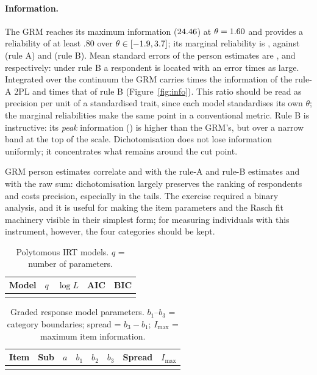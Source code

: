 \documentclass[11pt,a4paper]{article}
\begin{document}
\paragraph{Information.} The GRM reaches its maximum information
($24.46$) at $\theta=1.60$ and provides a reliability of at least .80
over $\theta\in[-1.9, 3.7]$; its marginal reliability is \GRMMargRel, against
\MargRelA{} (rule A) and \MargRelB{} (rule B). Mean standard errors of the person
estimates are \MeanSEGRM, \MeanSEA{} and \MeanSEB{} respectively: under rule B a
respondent is located with an error \SEratioBGRM{} times as large. Integrated over the
continuum the GRM carries \InfoRatioA{} times the information of the rule-A 2PL and
\InfoRatioB{} times that of rule B (Figure~\ref{fig:info}). This ratio should be read as
precision per unit of a standardised trait, since each model standardises its own
$\theta$; the marginal reliabilities make the same point in a conventional metric.
Rule B is instructive: its \emph{peak} information (\MaxInfoB) is higher than the GRM's,
but over a narrow band at the top of the scale. Dichotomisation does not lose information
uniformly; it concentrates what remains around the cut point.

GRM person estimates correlate \GRMThetaCorrA{} and \GRMThetaCorrB{} with the rule-A and
rule-B estimates and \GRMThetaSum{} with the raw sum: dichotomisation largely preserves
the ranking of respondents and costs precision, especially in the tails. The exercise
required a binary analysis, and it is useful for making the item parameters and the Rasch
fit machinery visible in their simplest form; for measuring individuals with this
instrument, however, the four categories should be kept.

\begin{table}[t]
\centering\small
\caption{Polytomous IRT models. $q$ = number of parameters.}
\label{tab:poly}
\begin{tabular}{lrrrr}
\toprule
Model & $q$ & $\log L$ & AIC & BIC\\
\midrule
\\
\bottomrule
\end{tabular}
\end{table}

\begin{table}[t]
\centering\small
\caption{Graded response model parameters. $b_1$--$b_3$ = category boundaries;
spread = $b_3-b_1$; $I_{\max}$ = maximum item information.}
\label{tab:grm}
\begin{tabular}{ll r rrr r r}
\toprule
Item & Sub & $a$ & $b_1$ & $b_2$ & $b_3$ & Spread & $I_{\max}$\\
\midrule
\\
\bottomrule
\end{tabular}
\end{table}
\end{document}

